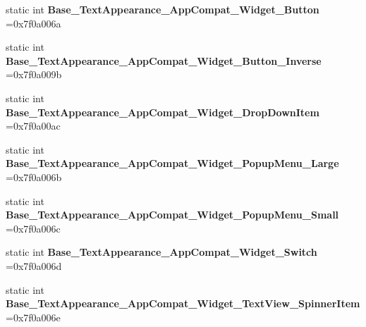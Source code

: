 \begin{DoxyCompactItemize}
\item 
\mbox{\label{classandroid_1_1support_1_1v4_1_1R_1_1style_a7fc218dfe5f42a2fa20bab0c771d01bf}} 
static int {\bfseries Base\+\_\+\+Text\+Appearance\+\_\+\+App\+Compat\+\_\+\+Widget\+\_\+\+Button} =0x7f0a006a
\item 
\mbox{\label{classandroid_1_1support_1_1v4_1_1R_1_1style_a736d21479e6cec7200f2a6578b975731}} 
static int {\bfseries Base\+\_\+\+Text\+Appearance\+\_\+\+App\+Compat\+\_\+\+Widget\+\_\+\+Button\+\_\+\+Inverse} =0x7f0a009b
\item 
\mbox{\label{classandroid_1_1support_1_1v4_1_1R_1_1style_ae8c87c9a2cb13b8161e2509100b5128e}} 
static int {\bfseries Base\+\_\+\+Text\+Appearance\+\_\+\+App\+Compat\+\_\+\+Widget\+\_\+\+Drop\+Down\+Item} =0x7f0a00ac
\item 
\mbox{\label{classandroid_1_1support_1_1v4_1_1R_1_1style_ad0d2175513d89924d5dead98265f755d}} 
static int {\bfseries Base\+\_\+\+Text\+Appearance\+\_\+\+App\+Compat\+\_\+\+Widget\+\_\+\+Popup\+Menu\+\_\+\+Large} =0x7f0a006b
\item 
\mbox{\label{classandroid_1_1support_1_1v4_1_1R_1_1style_a59a4b825bca4325e88d4c9177657977c}} 
static int {\bfseries Base\+\_\+\+Text\+Appearance\+\_\+\+App\+Compat\+\_\+\+Widget\+\_\+\+Popup\+Menu\+\_\+\+Small} =0x7f0a006c
\item 
\mbox{\label{classandroid_1_1support_1_1v4_1_1R_1_1style_ae777c1398184ff59639e00970b366aff}} 
static int {\bfseries Base\+\_\+\+Text\+Appearance\+\_\+\+App\+Compat\+\_\+\+Widget\+\_\+\+Switch} =0x7f0a006d
\item 
\mbox{\label{classandroid_1_1support_1_1v4_1_1R_1_1style_ad6f199708908ad99bc6a7c96dcebf8f4}} 
static int {\bfseries Base\+\_\+\+Text\+Appearance\+\_\+\+App\+Compat\+\_\+\+Widget\+\_\+\+Text\+View\+\_\+\+Spinner\+Item} =0x7f0a006e
\item 
\mbox{\label{classandroid_1_1support_1_1v4_1_1R_1_1style_a1eb8bdbfcf702f96a387edb8e7ce3ba3}} 

\end{DoxyCompactItemize}
